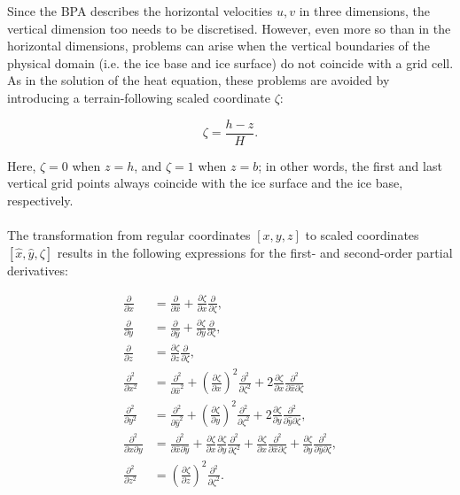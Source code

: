 \documentclass{article}
\begin{document}
Since the BPA describes the horizontal velocities $u,v$ in three dimensions, the vertical dimension too needs to be discretised. However, even more so than in the horizontal dimensions, problems can arise when the vertical boundaries of the physical domain (i.e. the ice base and ice surface) do not coincide with a grid cell. As in the solution of the heat equation, these problems are avoided by introducing a terrain-following scaled coordinate $\zeta$:

\begin{equation} \label{BPA_04}
\zeta = \frac{h - z}{H}.
\end{equation}

Here, $\zeta = 0$ when $z = h$, and $\zeta = 1$ when $z = b$; in other words, the first and last vertical grid points always coincide with the ice surface and the ice base, respectively.\\
\\
The transformation from regular coordinates $[x,y,z]$ to scaled coordinates $[\hat{x},\hat{y},\zeta]$ results in the following expressions for the first- and second-order partial derivatives:

\begin{align} \label{BPA_05}
\frac{\partial}{\partial x} &= \frac{\partial}{\partial \hat{x}} +
\frac{\partial \zeta}{\partial x} \frac{\partial}{\partial \zeta}, \\
\frac{\partial}{\partial y} &= \frac{\partial}{\partial \hat{y}} +
\frac{\partial \zeta}{\partial y} \frac{\partial}{\partial \zeta}, \\
\frac{\partial}{\partial z} &= \frac{\partial \zeta}{\partial z} \frac{\partial}{\partial \zeta}, \\
\frac{\partial^2}{\partial x^2} &= \frac{\partial^2}{\partial \hat{x}^2} + 
{\left( \frac{\partial \zeta}{\partial x} \right)}^2 \frac{\partial^2}{\partial \zeta^2}+ 
2 \frac{\partial \zeta}{\partial x} \frac{\partial^2}{\partial \hat{x} \partial \zeta} \\
\frac{\partial^2}{\partial y^2} &= \frac{\partial^2}{\partial \hat{y}^2} + 
{\left( \frac{\partial \zeta}{\partial y} \right)}^2 \frac{\partial^2}{\partial \zeta^2}+ 
2 \frac{\partial \zeta}{\partial y} \frac{\partial^2}{\partial \hat{y} \partial \zeta}, \\
\frac{\partial^2}{\partial x \partial y} &= \frac{\partial^2}{\partial \hat{x} \partial \hat{y}} +
\frac{\partial \zeta}{\partial x} \frac{\partial \zeta}{\partial y} \frac{\partial^2}{\partial \zeta^2} +
\frac{\partial \zeta}{\partial x} \frac{\partial^2}{\partial \hat{x} \partial \zeta} +
\frac{\partial \zeta}{\partial y} \frac{\partial^2}{\partial \hat{y} \partial \zeta}, \\
\frac{\partial^2}{\partial z^2} &= {\left( \frac{\partial \zeta}{\partial z} \right) }^2
\frac{\partial^2}{\partial \zeta^2}.
\end{align}
\end{document}
